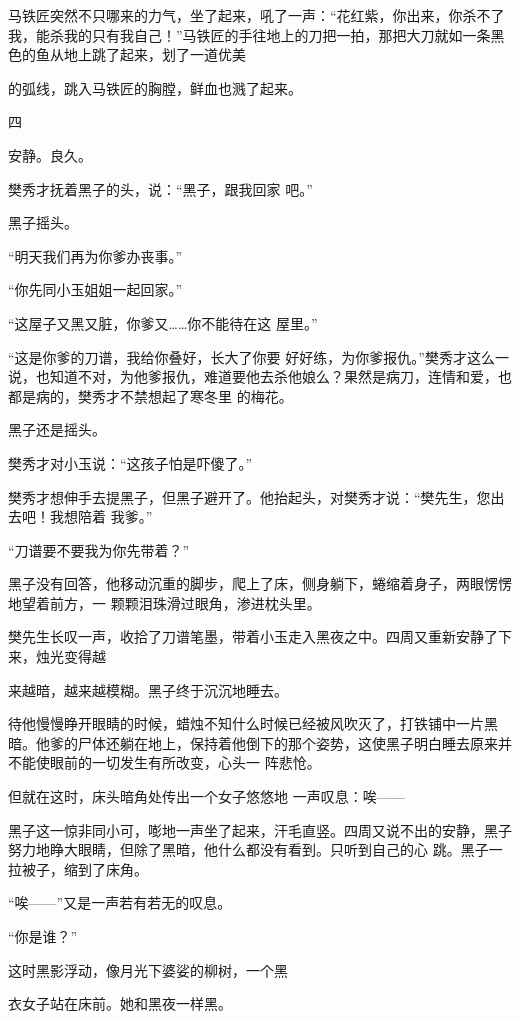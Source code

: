 \documentclass{article}
\begin{document}
马铁匠突然不只哪来的力气，坐了起来，吼了一声：“花红紫，你出来，你杀不了我，能杀我的只有我自己！”马铁匠的手往地上的刀把一拍，那把大刀就如一条黑色的鱼从地上跳了起来，划了一道优美

\newpage
的弧线，跳入马铁匠的胸膛，鲜血也溅了起来。 


四 


安静。良久。 

樊秀才抚着黑子的头，说：“黑子，跟我回家
吧。” 


黑子摇头。 


“明天我们再为你爹办丧事。” 



“你先同小玉姐姐一起回家。” 


“这屋子又黑又脏，你爹又……你不能待在这
屋里。” 


“这是你爹的刀谱，我给你叠好，长大了你要
\newpage
好好练，为你爹报仇。”樊秀才这么一说，也知道不对，为他爹报仇，难道要他去杀他娘么？果然是病刀，连情和爱，也都是病的，樊秀才不禁想起了寒冬里
的梅花。 


黑子还是摇头。 


樊秀才对小玉说：“这孩子怕是吓傻了。” 

樊秀才想伸手去提黑子，但黑子避开了。他抬起头，对樊秀才说：“樊先生，您出去吧！我想陪着
我爹。” 


“刀谱要不要我为你先带着？” 

黑子没有回答，他移动沉重的脚步，爬上了床，侧身躺下，蜷缩着身子，两眼愣愣地望着前方，一
颗颗泪珠滑过眼角，渗进枕头里。 

樊先生长叹一声，收拾了刀谱笔墨，带着小玉走入黑夜之中。四周又重新安静了下来，烛光变得越
\newpage

来越暗，越来越模糊。黑子终于沉沉地睡去。 

待他慢慢睁开眼睛的时候，蜡烛不知什么时候已经被风吹灭了，打铁铺中一片黑暗。他爹的尸体还躺在地上，保持着他倒下的那个姿势，这使黑子明白睡去原来并不能使眼前的一切发生有所改变，心头一
阵悲怆。 

但就在这时，床头暗角处传出一个女子悠悠地
一声叹息：唉—— 

黑子这一惊非同小可，嘭地一声坐了起来，汗毛直竖。四周又说不出的安静，黑子努力地睁大眼睛，但除了黑暗，他什么都没有看到。只听到自己的心
跳。黑子一拉被子，缩到了床角。 


“唉——”又是一声若有若无的叹息。 


“你是谁？” 

这时黑影浮动，像月光下婆娑的柳树，一个黑
\newpage

衣女子站在床前。她和黑夜一样黑。 
\end{document}
